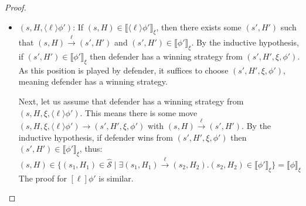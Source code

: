 \documentclass[10pt,a4paper]{article}
\theoremstyle{definition}
\theoremstyle{remark}
\newcommand\new[0]{\reflectbox{\ensuremath{\mathsf{N}}}}
\newcommand\fresh[1]{\new #1.}
\newcommand\diam[1]{\langle#1\rangle}
\newcommand\sq[1]{[#1]}
\newcommand\sem[2][\xi]{\llbracket#2\rrbracket_{#1}}
\newcommand\Scal{\mathcal{S}}
\newcommand\fstates[0]{\hat{\Scal}}
\begin{document}
\begin{proof}
\begin{itemize}
		The proof for $\bigwedge_x \phi'$ and $\fresh{x} \phi'$ is similar.
				\item $(s, H,\diam{\ell} \phi')$: If $(s, H)\in \sem{\diam{\ell} \phi'}$, then there exists some $(s', H')$ such that $(s, H) \xrightarrow{\ell} (s', H')$ and $(s', H')\in \sem{\phi'}$. 
		By the inductive hypothesis, if $(s', H')\in \sem{\phi'}$ then defender has a winning strategy from $(s', H', \xi, \phi')$.
		As this position is played by defender, it suffices to choose $(s', H', \xi, \phi')$, meaning defender has a winning strategy.  
		
		Next, let us assume that defender has a winning strategy from $(s, H, \xi, \diam{\ell} \phi')$. 
		This means there is some move $(s, H, \xi, \diam{\ell} \phi') \to (s', H', \xi, \phi')$ with $(s, H) \xrightarrow{\ell} (s', H')$. 
		By the inductive hypothesis, if defender wins from $(s', H', \xi, \phi')$ then $(s', H') \in \sem{\phi'}$, thus:
		\[
			(s, H) \in \{(s_1, H_1) \in \fstates \mid \exists (s_1, H_1) \xrightarrow{\ell} (s_2, H_2).(s_2, H_2) \in \sem{\phi'}\} = \sem{\phi}
		\]	
		The proof for $\sq{\ell} \phi'$ is similar.
		

\end{itemize}
\end{proof}
\end{document}
